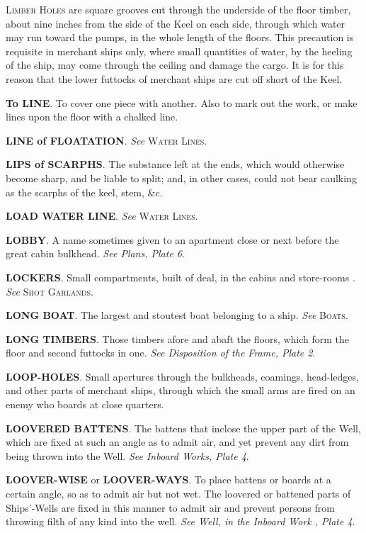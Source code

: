 \textsc{Limber Holes} are square grooves cut through the underside of the floor timber, about nine inches from the side of the Keel on each side, through which water may run toward the pumps, in the whole length of the floors. This precaution is requisite in merchant ships only, where small quantities of water, by the heeling of the ship, may come through the ceiling and damage the cargo. It is for this reason that the lower futtocks of merchant ships are cut off short of the Keel.

\textbf{To LINE}. To cover one piece with another. Also to mark out the work, or make lines upon the floor with a chalked line. 

\textbf{LINE of FLOATATION}. \textit{See} \textsc{Water Lines}. 

\textbf{LIPS of SCARPHS}. The substance left at the ends, which would otherwise become sharp, and be liable to split; and, in other cases, could not bear caulking as the scarphs of the keel, stem, \&c. 

\textbf{LOAD WATER LINE}. \textit{See} \textsc{Water Lines}. 

\textbf{LOBBY}. A name sometimes given to an apartment close or next before the great cabin bulkhead. \textit{See Plans, Plate 6}. 

\textbf{LOCKERS}. Small compartments, built of deal, in the cabins and store-rooms . \textit{See} \textsc{Shot Garlands}. 

\textbf{LONG BOAT}. The largest and stoutest boat belonging to a ship. \textit{See} \textsc{Boats}. 

\textbf{LONG TIMBERS}. Those timbers afore and abaft the floors, which form the floor and second futtocks in one. \textit{See Disposition of the Frame, Plate 2}. 

\textbf{LOOP-HOLES}. Small apertures through the bulkheads, coamings, head-ledges, and other parts of merchant ships, through which the small arms are fired on an enemy who boards at close quarters. 

\textbf{LOOVERED BATTENS}. The battens that inclose the upper part of the Well, which are fixed at such an angle as to admit air, and yet prevent any dirt from being thrown into the Well. \textit{See Inboard Works, Plate 4}. 

\textbf{LOOVER-WISE} or \textbf{LOOVER-WAYS}. To place battens or boards at a certain angle, so as to admit air but not wet. The loovered or battened parts of Ships'-Wells are fixed in this manner to admit air and prevent persons from throwing filth of any kind into the well. \textit{See Well, in the Inboard Work , Plate 4}. 

